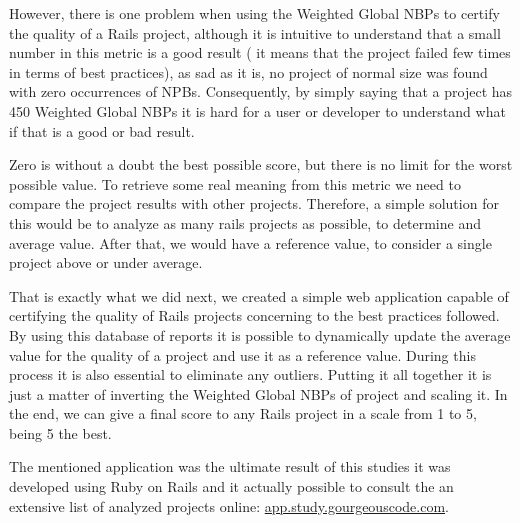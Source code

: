 However, there is one problem when using the Weighted Global NBPs to certify the quality of a Rails project, 
although it is intuitive to understand that a small number in this metric is a good result
( it means that the project failed few times in terms of best practices), as sad as it is, 
no project of normal size was found with zero occurrences of NPBs.
Consequently, by simply saying that a project has 450 Weighted Global NBPs it is hard for a user or developer
to understand what if that is a good or bad result.

Zero is without a doubt the best possible score, but there is no limit for the worst possible value.
To retrieve some real meaning from this metric we need to compare the project results with other projects.
Therefore, a simple solution for this would be to analyze as many rails projects as possible, to determine and average value.
After that, we would have a reference value, to consider a single project above or under average.

That is exactly what we did next, 
we created a simple web application capable of certifying the quality of Rails projects concerning to the best practices followed. 
By using this database of reports it is possible to dynamically update the average value for the quality of a project 
and use it as a reference value. During this process it is also essential to eliminate any outliers. 
Putting it all together it is just a matter of inverting the Weighted Global NBPs of project and scaling it. 
In the end, we can give a final score to any Rails project in a scale from 1 to 5, being 5 the best.

The mentioned application was the ultimate result of this studies it was developed using Ruby on Rails
and it actually possible to consult the an extensive list of analyzed projects online: \url{app.study.gourgeouscode.com}.










